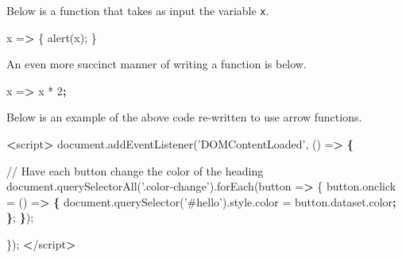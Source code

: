 \documentclass[]{book}
\newenvironment{Shaded}{\begin{snugshade}}{\end{snugshade}}
\newcommand{\ExtensionTok}[1]{#1}
\newcommand{\KeywordTok}[1]{\textcolor[rgb]{0.13,0.29,0.53}{\textbf{#1}}}
\newcommand{\NormalTok}[1]{#1}
\newcommand{\OperatorTok}[1]{\textcolor[rgb]{0.81,0.36,0.00}{\textbf{#1}}}
\newcommand{\StringTok}[1]{\textcolor[rgb]{0.31,0.60,0.02}{#1}}
\begin{document}
Below is a function that takes as input the variable \texttt{x}.

\begin{Shaded}
\begin{Highlighting}[]
\ExtensionTok{x}\NormalTok{ =}\OperatorTok{>}\NormalTok{ \{}
    \ExtensionTok{alert}\NormalTok{(x);}
\NormalTok{\}}
\end{Highlighting}
\end{Shaded}

An even more succinct manner of writing a function is below.

\begin{Shaded}
\begin{Highlighting}[]
\ExtensionTok{x}\NormalTok{ =}\OperatorTok{>}\NormalTok{ x * 2}\KeywordTok{;}
\end{Highlighting}
\end{Shaded}

Below is an example of the above code re-written to use arrow functions.

\begin{Shaded}
\begin{Highlighting}[]
\OperatorTok{<}\ExtensionTok{script}\OperatorTok{>}                                                                            
    \ExtensionTok{document.addEventListener}\NormalTok{(}\StringTok{'DOMContentLoaded'}\NormalTok{, () =}\OperatorTok{>} \KeywordTok{\{}                           
                                                                                    
        \ExtensionTok{//}\NormalTok{ Have each button change the color of the heading                         }
        \ExtensionTok{document.querySelectorAll}\NormalTok{(}\StringTok{'.color-change'}\NormalTok{)}\ExtensionTok{.forEach}\NormalTok{(button =}\OperatorTok{>}\NormalTok{ \{              }
            \ExtensionTok{button.onclick}\NormalTok{ = () =}\OperatorTok{>} \KeywordTok{\{}                                                
                \ExtensionTok{document.querySelector}\NormalTok{(}\StringTok{'#hello'}\NormalTok{)}\ExtensionTok{.style.color}\NormalTok{ = button.dataset.color}\KeywordTok{;}
            \KeywordTok{\}}\NormalTok{;                                                                      }
        \KeywordTok{\}}\NormalTok{);                                                                         }
                                                                                    
\NormalTok{    \});                                                                             }
\OperatorTok{<}\NormalTok{/}\ExtensionTok{script}\OperatorTok{>}                                                                           
\end{Highlighting}
\end{Shaded}
\end{document}
